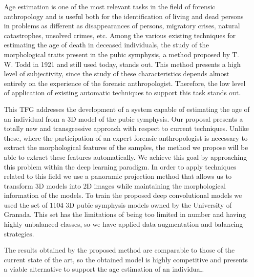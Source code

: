 

Age estimation is one of the most relevant tasks in the field of forensic anthropology and is useful both for the identification of living and dead persons in problems as different as disappearances of persons, migratory crises, natural catastrophes, unsolved crimes, etc. 
Among the various existing techniques for estimating the age of death in deceased individuals, the study of the morphological traits present in the pubic symphysis, a method proposed by T. W. Todd in 1921 and still used today, stands out. This method presents a high level of subjectivity, since the study of these characteristics depends almost entirely on the experience of the forensic anthropologist. Therefore, the low level of application of existing automatic techniques to support this task stands out.


This TFG addresses the development of a system capable of estimating the age of an individual from a 3D model of the pubic symphysis. Our proposal presents a totally new and transgressive approach with respect to current techniques. Unlike these, where the participation of an expert forensic anthropologist is necessary to extract the morphological features of the samples, the method we propose will be able to extract these features automatically. We achieve this goal by approaching this problem within the deep learning paradigm. In order to apply techniques related to this field we use a panoramic projection method that allows us to transform 3D models into 2D images while maintaining the morphological information of the models. To train the proposed deep convolutional models we used the set of 1104 3D pubic symphysis models owned by the University of Granada. This set has the limitations of being too limited in number and having highly unbalanced classes, so we have applied data augmentation and balancing strategies.

The results obtained by the proposed method are comparable to those of the current state of the art, so the obtained model is highly competitive and presents a viable alternative to support the age estimation of an individual.